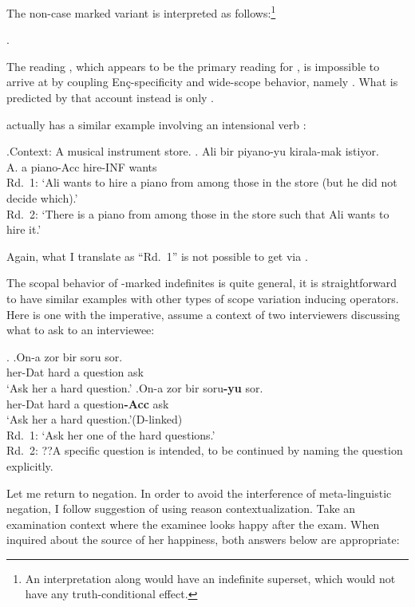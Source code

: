 \documentclass[11pt,a4paper]{article}
\newcommand{\encspec}{Enç-specific}
\begin{document}
The non-case marked variant  is interpreted as follows:\footnote{An
interpretation along  would have an indefinite superset, which
would not have any truth-conditional effect.}

\ex. 


The reading , which appears to be the primary reading for
, is impossible to arrive at by coupling \encspec ity and
wide-scope behavior, namely . What is predicted by that
account instead is only .

 actually has a similar example involving an intensional verb
:

\ex.Context: A musical instrument store.
\ag. Ali bir piyano-yu kirala-mak istiyor.\\
A. a piano-Acc hire-INF wants\\
Rd.\ 1: `Ali wants to hire a piano from among those in the store (but he did not decide which).'\\
Rd.\ 2: `There is a piano from among those in the store such that Ali wants to hire it.'

Again, what I translate as ``Rd.\ 1'' is not possible to get via .

The scopal behavior of \acc-marked indefinites is quite general, it is
straightforward to have similar examples with other types of scope variation
inducing operators. Here is one with the imperative, assume a context of two
interviewers discussing what to ask to an interviewee:

\ex.
\ag.\label{impz}{On-a} {zor} {bir} {soru} {sor}.\\
{her-Dat} {hard} {a} {question} {ask}\\
`Ask her a hard question.'
\bg.\label{impa}{On-a} {zor} {bir} {soru\bf{-yu}} {sor}.\\
{her-Dat} {hard} {a} {question\bf{-Acc}} {ask}\\
`Ask her a hard question.'\hfill (D-linked)\\
Rd.\ 1: `Ask her one of the hard questions.'\\
Rd.\ 2: ??A specific question is intended, to be continued by naming the question
explicitly.


Let me return to negation. In order to avoid the interference of
meta-linguistic negation, I follow  suggestion of using
reason contextualization. Take an examination context where the examinee looks
happy after the exam. When inquired about the source of her happiness, both
answers below are appropriate:  
\end{document}

